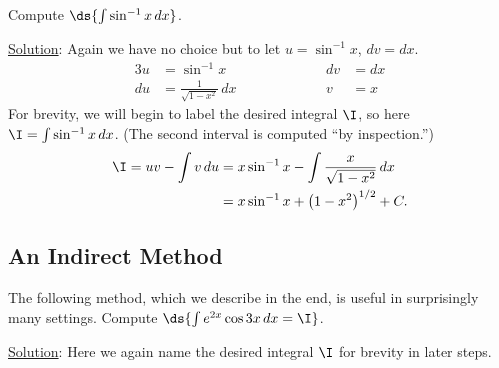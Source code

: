 \bex Compute $\ds{\int\sin^{-1}x\,dx}$.

\underline{Solution}: Again we have no choice but to let $u=\sin^{-1}x$,
$dv=dx$.
\begin{alignat*}{3}
u&=\sin^{-1}x&&\qquad\qquad&dv&=dx\\
du&=\frac1{\sqrt{1-x^2}}\,dx&&&v&=x\end{alignat*}
For brevity, we will begin to label the desired integral $\I$,
so here $\I=\int\sin^{-1}x\,dx$.
(The second interval is computed ``by inspection.'')
\begin{align*}
\I=uv-\int v\,du&=x\sin^{-1}x-\int\frac{x}{\sqrt{1-x^2}}\,dx\\
                &=x\sin^{-1}x+\left(1-x^2\right)^{1/2}+C.\end{align*}

\eex


\newpage
\subsection{An Indirect Method}
The following method, which we describe in the end, is
useful in surprisingly many settings.
\bex Compute $\ds{\int e^{2x}\cos3x\,dx=\I}$.

\underline{Solution}: Here we again name the desired integral
$\I$ for brevity in later steps.

